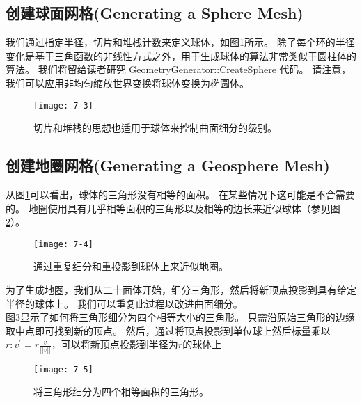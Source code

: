 \subsection{创建球面网格(Generating a Sphere Mesh)}
\begin{flushleft}
我们通过指定半径，切片和堆栈计数来定义球体，如图\ref{fig:7-3}所示。 除了每个环的半径变化是基于三角函数的非线性方式之外，用于生成球体的算法非常类似于圆柱体的算法。 我们将留给读者研究 GeometryGenerator::CreateSphere 代码。 请注意，我们可以应用非均匀缩放世界变换将球体变换为椭圆体。
\end{flushleft}
\begin{figure}[h]
    \texttt{[image: 7-3]}
    \centering
    \caption{切片和堆栈的思想也适用于球体来控制曲面细分的级别。}
    \label{fig:7-3}
\end{figure}

\subsection{创建地圈网格(Generating a Geosphere Mesh)}
\begin{flushleft}
从图\ref{fig:7-3}可以看出，球体的三角形没有相等的面积。 在某些情况下这可能是不合需要的。 地圈使用具有几乎相等面积的三角形以及相等的边长来近似球体（参见图\ref{fig:7-4}）。
\end{flushleft}

\begin{figure}[h]
    \texttt{[image: 7-4]}
    \centering
    \caption{通过重复细分和重投影到球体上来近似地圈。}
    \label{fig:7-4}
\end{figure}

\begin{flushleft}
为了生成地圈，我们从二十面体开始，细分三角形，然后将新顶点投影到具有给定半径的球体上。 我们可以重复此过程以改进曲面细分。\\
图\ref{fig:7-5}显示了如何将三角形细分为四个相等大小的三角形。 只需沿原始三角形的边缘取中点即可找到新的顶点。 然后，通过将顶点投影到单位球上然后标量乘以$r: v^{'}=r \frac{v}{||v||}$，可以将新顶点投影到半径为$r$的球体上
\end{flushleft}

\begin{figure}[h]
    \texttt{[image: 7-5]}
    \centering
    \caption{将三角形细分为四个相等面积的三角形。}
    \label{fig:7-5}
\end{figure}

